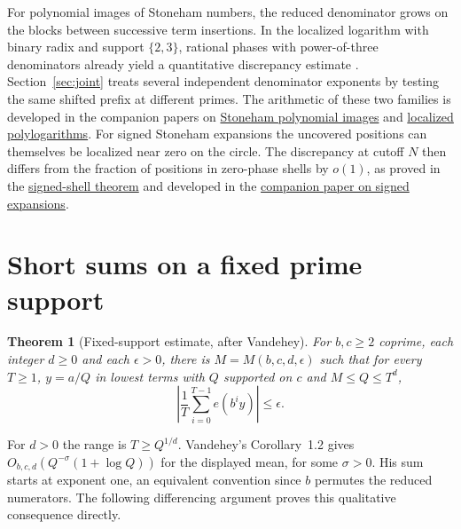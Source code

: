 \documentclass[11pt]{article}
\newtheorem{theorem}{Theorem}
\newcommand{\baseurl}{https://github.com/eldernos/MathematicsResearch/blob/a09e011720bc74396a27f4cb3ce2d8a5b3ce5035}
\newcommand{\src}[3]{\href{\baseurl/NormalityChecker/#1.lean\#L#2}{#3}}
\begin{document}
For polynomial images of Stoneham numbers, the reduced denominator grows on the blocks between successive term insertions. In the localized logarithm with binary radix and support \(\{2,3\}\), rational phases with power-of-three denominators already yield a quantitative discrepancy estimate \cite[Thms.~1.1, 4.1]{localized}. Section~\ref{sec:joint} treats several independent denominator exponents by testing the same shifted prefix at different primes. The arithmetic of these two families is developed in the companion papers on \href{https://github.com/eldernos/MathematicsResearch/blob/3545d5f3072502e41d633d8900f20ad96c36be64/papers/01-stoneham-polynomials/paper.pdf}{Stoneham polynomial images} and \href{https://github.com/eldernos/MathematicsResearch/blob/3545d5f3072502e41d633d8900f20ad96c36be64/papers/02-localized-normality/paper.pdf}{localized polylogarithms}. For signed Stoneham expansions the uncovered positions can themselves be localized near zero on the circle. The discrepancy at cutoff \(N\) then differs from the fraction of positions in zero-phase shells by \(o(1)\), as proved in the \src{SignedShellDiscrepancy}{144}{signed-shell theorem} and developed in the \href{https://github.com/eldernos/MathematicsResearch/blob/3545d5f3072502e41d633d8900f20ad96c36be64/papers/03-signed-resonance/paper.pdf}{companion paper on signed expansions}.

\section{Short sums on a fixed prime support}
\begin{theorem}[Fixed-support estimate, after Vandehey]\label{thm:short}
For \(b,c\ge2\) coprime, each integer \(d\ge0\) and each \(\epsilon>0\), there is \(M=M(b,c,d,\epsilon)\) such that for every \(T\ge1\), \(y=a/Q\) in lowest terms with \(Q\) supported on \(c\) and \(M\le Q\le T^d\),
\[
 \left|\frac1T\sum_{i=0}^{T-1}e(b^iy)\right|\le\epsilon .
\]
\end{theorem}
For \(d>0\) the range is \(T\ge Q^{1/d}\). Vandehey's Corollary~1.2 gives \(O_{b,c,d}(Q^{-\sigma}(1+\log Q))\) for the displayed mean, for some \(\sigma>0\). His sum starts at exponent one, an equivalent convention since \(b\) permutes the reduced numerators. The following differencing argument proves this qualitative consequence directly.
\end{document}
